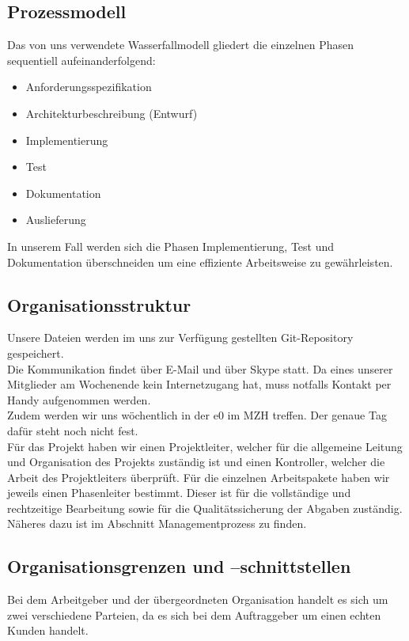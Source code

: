 \documentclass[fontsize=12pt,paper=a4,twoside]{scrartcl}
\begin{document}
\subsection{Prozessmodell}
\label{sec:prozessmodell}

Das von uns verwendete Wasserfallmodell gliedert die einzelnen Phasen sequentiell aufeinanderfolgend:\\
\begin{itemize}
\item Anforderungsspezifikation
\item Architekturbeschreibung (Entwurf)
\item Implementierung
\item Test
\item Dokumentation
\item Auslieferung
\end{itemize}
In unserem Fall werden sich die Phasen Implementierung, Test und Dokumentation überschneiden um eine effiziente Arbeitsweise zu gewährleisten.

\subsection{Organisationsstruktur}

Unsere Dateien werden im uns zur Verfügung gestellten Git-Repository gespeichert.\\
Die Kommunikation findet über E-Mail und über Skype statt. Da eines unserer Mitglieder am Wochenende kein Internetzugang hat, muss notfalls Kontakt per Handy aufgenommen werden. \\ 
Zudem werden wir uns wöchentlich in der e0 im MZH treffen. Der genaue Tag dafür steht noch nicht fest.\\ 
Für das Projekt haben wir einen Projektleiter, welcher für die allgemeine Leitung und Organisation des Projekts zuständig ist und einen Kontroller, welcher die Arbeit des Projektleiters überprüft. Für die einzelnen Arbeitspakete haben wir jeweils einen Phasenleiter bestimmt. Dieser ist für die vollständige und rechtzeitige Bearbeitung sowie für die Qualitätssicherung der Abgaben zuständig. Näheres dazu ist im Abschnitt Managementprozess zu finden.

\subsection{Organisationsgrenzen und --schnittstellen}

Bei dem Arbeitgeber und der übergeordneten Organisation handelt es sich um zwei verschiedene Parteien, da es sich bei dem Auftraggeber um einen echten Kunden handelt.
\end{document}
